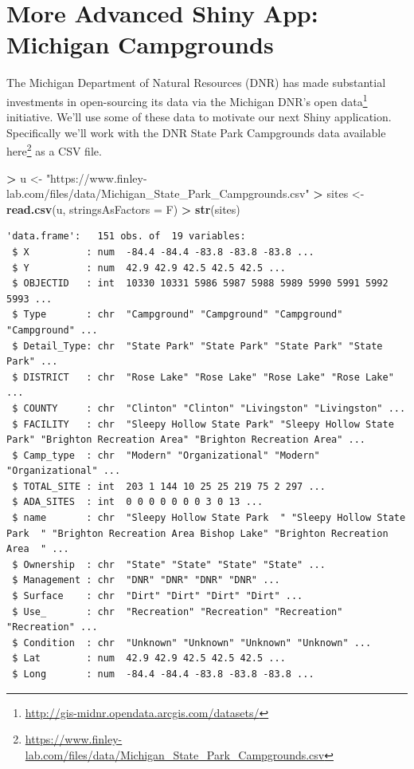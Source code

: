 \documentclass[
]{krantz}
\makeatletter
\newenvironment{Shaded}{\begin{snugshade}}{\end{snugshade}}
\newcommand{\DataTypeTok}[1]{\textcolor[rgb]{0.27,0.27,0.27}{#1}}
\newcommand{\KeywordTok}[1]{\textcolor[rgb]{0.27,0.27,0.27}{\textbf{#1}}}
\newcommand{\NormalTok}[1]{#1}
\newcommand{\OperatorTok}[1]{\textcolor[rgb]{0.43,0.43,0.43}{\textbf{#1}}}
\newcommand{\StringTok}[1]{\textcolor[rgb]{0.5,0.5,0.5}{#1}}
\renewcommand{\href}[2]{#2\footnote{\url{#1}}}
\newenvironment{kframe}{%
\medskip{}
\setlength{\fboxsep}{.8em}
 \def\at@end@of@kframe{}%
 \ifinner\ifhmode%
  \def\at@end@of@kframe{\end{minipage}}%
  \begin{minipage}{\columnwidth}%
 \fi\fi%
 \def\FrameCommand##1{\hskip\@totalleftmargin \hskip-\fboxsep
 \colorbox{shadecolor}{##1}\hskip-\fboxsep
     \hskip-\linewidth \hskip-\@totalleftmargin \hskip\columnwidth}%
 \MakeFramed {\advance\hsize-\width
   \@totalleftmargin\z@ \linewidth\hsize
   \@setminipage}}%
 {\par\unskip\endMakeFramed%
 \at@end@of@kframe}
\renewenvironment{Shaded}{\begin{kframe}}{\end{kframe}}
\makeatother
\begin{document}
\hypertarget{more-advanced-shiny-app-michigan-campgrounds}{%
\section{More Advanced Shiny App: Michigan Campgrounds}\label{more-advanced-shiny-app-michigan-campgrounds}}

The Michigan Department of Natural Resources (DNR) has made substantial investments in open-sourcing its data via the \href{http://gis-midnr.opendata.arcgis.com/datasets/}{Michigan DNR's open data} initiative. We'll use some of these data to motivate our next Shiny application. Specifically we'll work with the DNR State Park Campgrounds data available \href{https://www.finley-lab.com/files/data/Michigan_State_Park_Campgrounds.csv}{here} as a CSV file.

\begin{Shaded}
\begin{Highlighting}[]
\OperatorTok{\textgreater{}}\StringTok{ }\NormalTok{u \textless{}{-}}\StringTok{ "https://www.finley{-}lab.com/files/data/Michigan\_State\_Park\_Campgrounds.csv"}
\OperatorTok{\textgreater{}}\StringTok{ }\NormalTok{sites \textless{}{-}}\StringTok{ }\KeywordTok{read.csv}\NormalTok{(u, }\DataTypeTok{stringsAsFactors =}\NormalTok{ F)}
\OperatorTok{\textgreater{}}\StringTok{ }\KeywordTok{str}\NormalTok{(sites)}
\end{Highlighting}
\end{Shaded}

\begin{verbatim}
'data.frame':   151 obs. of  19 variables:
 $ X          : num  -84.4 -84.4 -83.8 -83.8 -83.8 ...
 $ Y          : num  42.9 42.9 42.5 42.5 42.5 ...
 $ OBJECTID   : int  10330 10331 5986 5987 5988 5989 5990 5991 5992 5993 ...
 $ Type       : chr  "Campground" "Campground" "Campground" "Campground" ...
 $ Detail_Type: chr  "State Park" "State Park" "State Park" "State Park" ...
 $ DISTRICT   : chr  "Rose Lake" "Rose Lake" "Rose Lake" "Rose Lake" ...
 $ COUNTY     : chr  "Clinton" "Clinton" "Livingston" "Livingston" ...
 $ FACILITY   : chr  "Sleepy Hollow State Park" "Sleepy Hollow State Park" "Brighton Recreation Area" "Brighton Recreation Area" ...
 $ Camp_type  : chr  "Modern" "Organizational" "Modern" "Organizational" ...
 $ TOTAL_SITE : int  203 1 144 10 25 25 219 75 2 297 ...
 $ ADA_SITES  : int  0 0 0 0 0 0 0 3 0 13 ...
 $ name       : chr  "Sleepy Hollow State Park  " "Sleepy Hollow State Park  " "Brighton Recreation Area Bishop Lake" "Brighton Recreation Area  " ...
 $ Ownership  : chr  "State" "State" "State" "State" ...
 $ Management : chr  "DNR" "DNR" "DNR" "DNR" ...
 $ Surface    : chr  "Dirt" "Dirt" "Dirt" "Dirt" ...
 $ Use_       : chr  "Recreation" "Recreation" "Recreation" "Recreation" ...
 $ Condition  : chr  "Unknown" "Unknown" "Unknown" "Unknown" ...
 $ Lat        : num  42.9 42.9 42.5 42.5 42.5 ...
 $ Long       : num  -84.4 -84.4 -83.8 -83.8 -83.8 ...
\end{verbatim}
\end{document}
